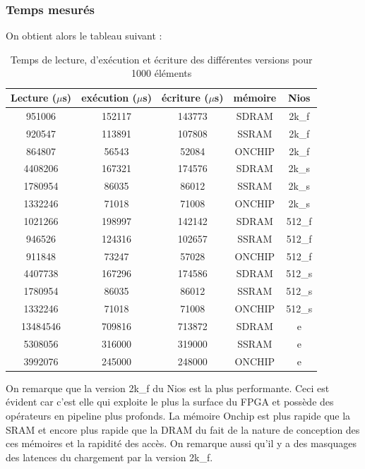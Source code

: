 \documentclass[12pt,a4paper]{article}
\begin{document}
\subsubsection{Temps mesurés}
On obtient alors le tableau suivant :
\begin{table}[H]
	\centering
		\ttfamily
	\begin{tabular}{|c|c|c|c|c|}	

		\hline
		Lecture ($\mu$s) & exécution ($\mu$s) & écriture ($\mu$s) & mémoire &  Nios  \\ \hline
		   951006    &     152117     &    143773     &  SDRAM  & 2k\_f  \\ \hline
		   920547    &     113891     &    107808     &  SSRAM  & 2k\_f  \\ \hline
		   864807    &     56543      &     52084     & ONCHIP  & 2k\_f  \\
		   \hline		  \hline
		  4408206    &     167321     &    174576     &  SDRAM  & 2k\_s  \\ \hline
		  1780954    &     86035      &     86012     &  SSRAM  & 2k\_s  \\ \hline
		  1332246    &     71018      &     71008     & ONCHIP  & 2k\_s  \\ 

		  \hline		  \hline

		  1021266    &     198997     &    142142     &  SDRAM  & 512\_f \\ \hline
		   946526    &     124316     &    102657     &  SSRAM  & 512\_f \\ \hline
		   911848    &     73247      &     57028     & ONCHIP  & 512\_f \\ 

		   \hline		  \hline

		  4407738    &     167296     &    174586     &  SDRAM  & 512\_s \\ \hline
		  1780954    &     86035      &     86012     &  SSRAM  & 512\_s \\ \hline
		  1332246    &     71018      &     71008     & ONCHIP  & 512\_s \\ 
		  \hline		  \hline

		  13484546    &     709816     &    713872     &  SDRAM  &   e    \\ \hline
		  5308056    &     316000     &    319000     &  SSRAM  &   e    \\ \hline
		  3992076    &     245000     &    248000     & ONCHIP  &   e    \\ \hline
	\end{tabular}
\rmfamily
\caption{Temps de lecture, d'exécution et écriture des différentes versions pour 1000 éléments}
\label{table:time}
\end{table}
On remarque que la version 2k\_f du Nios est la plus performante. Ceci est évident car c'est elle qui exploite le plus la surface du FPGA et possède des opérateurs en pipeline plus profonds. La mémoire Onchip est plus rapide que la SRAM et encore plus rapide que la DRAM du fait de la nature de conception des ces mémoires et la rapidité des accès. On remarque aussi qu'il y a des masquages des latences du chargement par la version 2k\_f.
\end{document}
